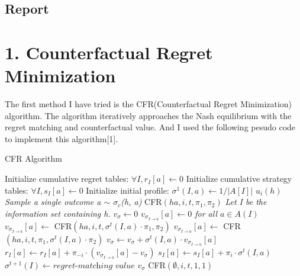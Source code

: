 \documentclass[11pt,a4paper]{article}
\begin{document}
\begin{center}
    \section*{Report}
\end{center}
\section*{1. Counterfactual Regret Minimization}
The first method I have tried is the CFR(Counterfactual Regret Minimization) algorithm. The algorithm iteratively
approaches the Nash equilibrium with the regret matching and counterfactual value.
And I used the following pesudo code to implement this algorithm[1].
\begin{algorithm}
    \caption{CFR Algorithm}\label{euclid}
    \begin{algorithmic}[1]
        \State  Initialize cumulative regret tables: $\forall I, r_I[a] \gets 0$
        \State  Initialize cumulative strategy tables: $\forall I, s_I[a] \gets 0$
        \State   Initialize initial profile: $\sigma^1(I,a) \gets 1/|A[I]|$
            \State \Return $u_i(h)$
            \State \textit{Sample a single outcome a $\sim$ $\sigma_c$(h, a)}
            \State \Return CFR$(ha, i, t, \pi_1, \pi_2)$
        \EndIf
        \State \textit{Let I be the information set containing h.}
        \State \textit{$v_\sigma \gets 0$}
        \State \textit{$v_{\sigma_{I \rightarrow a}}[a] \gets 0$ for all $a \in A(I)$}
            \State $v_{\sigma_{I \rightarrow a}}[a] \gets $ CFR$(ha, i, t, \sigma^t(I, a) \cdot \pi_1, \pi_2)$
            \State $v_{\sigma_{I \rightarrow a}}[a] \gets $ CFR$(ha, i, t, \pi_1, \sigma^t(I, a) \cdot \pi_2)$
            \EndIf
            \State \textit{$v_\sigma \gets v_\sigma + \sigma^t(I, a) \cdot v_{\sigma_{I \rightarrow a}}[a]$}
        \EndFor
                \State $r_I[a] \gets r_I[a] + \pi_{-i} \cdot (v_{\sigma_{I \rightarrow a}}[a] - v_\sigma)$
                \State $s_I[a] \gets s_I[a] + \pi_{i} \cdot \sigma^t(I, a)$
            \EndFor
            \State $\sigma^{t+1}(I) \gets \textit{regret-matching value}$
        \EndIf
        \State \Return $v_\sigma$
        \EndFunction
                \State CFR$(\emptyset, i, t, 1, 1)$
            \EndFor
        \EndFor
        \EndFunction
    \end{algorithmic}
\end{algorithm}
\end{document}
